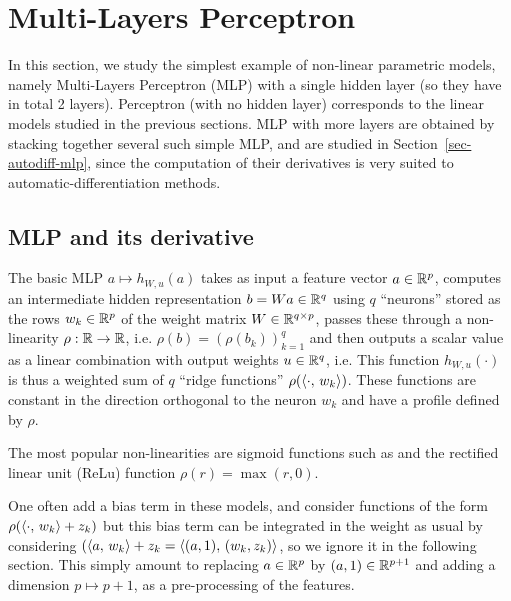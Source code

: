 

\section{Multi-Layers Perceptron}

In this section, we study the simplest example of non-linear parametric models, namely Multi-Layers Perceptron (MLP) with a single hidden layer (so they have in total 2 layers). Perceptron (with no hidden layer) corresponds to the linear models studied in the previous sections. MLP with more layers are obtained by stacking together several such simple MLP, and are studied in Section~\ref{sec-autodiff-mlp}, since the computation of their derivatives is very suited to automatic-differentiation methods.  

\subsection{MLP and its derivative}

The basic MLP $a \mapsto h_{W,u}(a)$ takes as input a feature vector $a \in \mathbb{R}^p$, computes an intermediate hidden representation $b = Wa \in \mathbb{R}^q$ using $q$ ``neurons'' stored as the rows $w_k \in \mathbb{R}^p$ of the weight matrix $W \in \mathbb{R}^{q \times p}$, passes these through a non-linearity $\rho : \mathbb{R} \rightarrow \mathbb{R}$, i.e. $\rho(b)=(\rho(b_k))_{k=1}^q$ and then outputs a scalar value as a linear combination with output weights $u \in \mathbb{R}^q$, i.e. 
This function $h_{W,u}(\cdot)$ is thus a weighted sum of $q$ ``ridge functions'' $\rho(\langle \cdot,\,w_k\rangle)$. These functions are constant in the direction orthogonal to the neuron $w_k$ and have a profile defined by $\rho$.

The most popular non-linearities are sigmoid functions such as
and the rectified linear unit (ReLu) function $\rho(r)=\max(r,0)$.

One often add a bias term in these models, and consider functions of the form $\rho(\langle \cdot,\,w_k\rangle+z_k)$ but this bias term can be integrated in the weight as usual by considering  $(\langle a,\,w_k\rangle+z_k = \langle (a,1),\,(w_k,z_k)\rangle$, so we ignore it in the following section. This simply amount to replacing $a \in \mathbb{R}^p$ by $(a,1) \in \mathbb{R}^{p+1}$ and adding a dimension $p \mapsto p+1$, as a pre-processing of the features.

